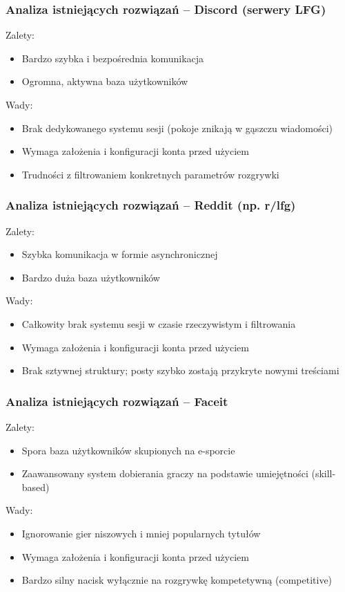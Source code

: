 \documentclass[10pt]{beamer}
\begin{document}
\begin{frame}
	\frametitle{Analiza istniejących rozwiązań -- Discord (serwery LFG)}

	Zalety:
	\begin{itemize}
		\item Bardzo szybka i bezpośrednia komunikacja
		\item Ogromna, aktywna baza użytkowników
	\end{itemize}
	Wady:
	\begin{itemize}
		\item Brak dedykowanego systemu sesji (pokoje znikają w gąszczu wiadomości)
		\item Wymaga założenia i konfiguracji konta przed użyciem
		\item Trudności z filtrowaniem konkretnych parametrów rozgrywki
	\end{itemize}
\end{frame}

\begin{frame}
	\frametitle{Analiza istniejących rozwiązań -- Reddit (np. r/lfg)}

	Zalety:
	\begin{itemize}
		\item Szybka komunikacja w formie asynchronicznej
		\item Bardzo duża baza użytkowników
	\end{itemize}
	Wady:
	\begin{itemize}
		\item Całkowity brak systemu sesji w czasie rzeczywistym i filtrowania
		\item Wymaga założenia i konfiguracji konta przed użyciem
		\item Brak sztywnej struktury; posty szybko zostają przykryte nowymi treściami
	\end{itemize}
\end{frame}

\begin{frame}
	\frametitle{Analiza istniejących rozwiązań -- Faceit}

	Zalety:
	\begin{itemize}
		\item Spora baza użytkowników skupionych na e-sporcie
		\item Zaawansowany system dobierania graczy na podstawie umiejętności (skill-based)
	\end{itemize}
	Wady:
	\begin{itemize}
		\item Ignorowanie gier niszowych i mniej popularnych tytułów
		\item Wymaga założenia i konfiguracji konta przed użyciem
		\item Bardzo silny nacisk wyłącznie na rozgrywkę kompetetywną (competitive)
	\end{itemize}
\end{frame}
\end{document}
